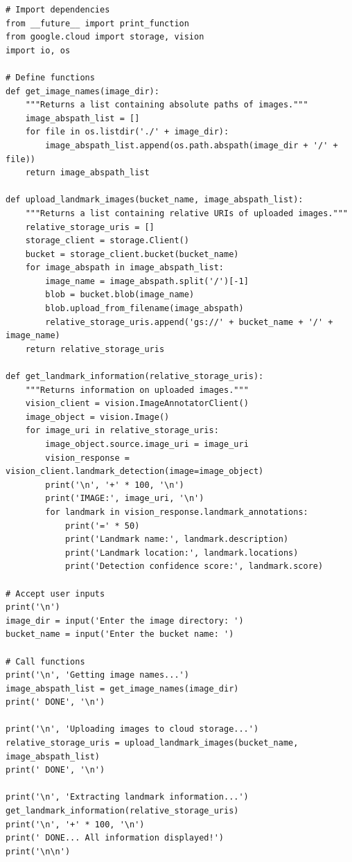 \documentclass{article}
\begin{document}
\begin{lstlisting}[style=python]
# Import dependencies
from __future__ import print_function
from google.cloud import storage, vision
import io, os

# Define functions
def get_image_names(image_dir):
    """Returns a list containing absolute paths of images."""
    image_abspath_list = []
    for file in os.listdir('./' + image_dir):
        image_abspath_list.append(os.path.abspath(image_dir + '/' + file))
    return image_abspath_list

def upload_landmark_images(bucket_name, image_abspath_list):
    """Returns a list containing relative URIs of uploaded images."""
    relative_storage_uris = []
    storage_client = storage.Client()
    bucket = storage_client.bucket(bucket_name)
    for image_abspath in image_abspath_list:
        image_name = image_abspath.split('/')[-1]
        blob = bucket.blob(image_name)
        blob.upload_from_filename(image_abspath)
        relative_storage_uris.append('gs://' + bucket_name + '/' + image_name)
    return relative_storage_uris

def get_landmark_information(relative_storage_uris):
    """Returns information on uploaded images."""
    vision_client = vision.ImageAnnotatorClient()
    image_object = vision.Image()
    for image_uri in relative_storage_uris:
        image_object.source.image_uri = image_uri
        vision_response = vision_client.landmark_detection(image=image_object)
        print('\n', '+' * 100, '\n')
        print('IMAGE:', image_uri, '\n')
        for landmark in vision_response.landmark_annotations:
            print('=' * 50)
            print('Landmark name:', landmark.description)
            print('Landmark location:', landmark.locations)
            print('Detection confidence score:', landmark.score)

# Accept user inputs
print('\n')
image_dir = input('Enter the image directory: ')
bucket_name = input('Enter the bucket name: ')

# Call functions
print('\n', 'Getting image names...')
image_abspath_list = get_image_names(image_dir)
print(' DONE', '\n')

print('\n', 'Uploading images to cloud storage...')
relative_storage_uris = upload_landmark_images(bucket_name, image_abspath_list)
print(' DONE', '\n')

print('\n', 'Extracting landmark information...')
get_landmark_information(relative_storage_uris)
print('\n', '+' * 100, '\n')
print(' DONE... All information displayed!')
print('\n\n')
\end{lstlisting}
\end{document}
